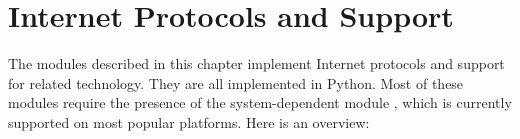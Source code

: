\chapter{Internet Protocols and Support \label{internet}}


The modules described in this chapter implement Internet protocols and 
support for related technology.  They are all implemented in Python.
Most of these modules require the presence of the system-dependent
module , which is currently
supported on most popular platforms.  Here is an overview:

\localmoduletable
